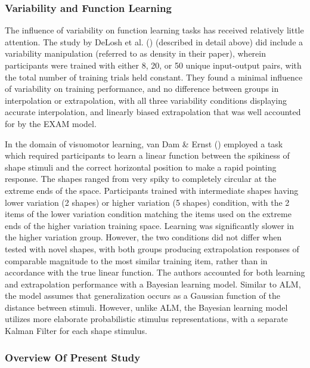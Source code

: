 \documentclass[
  11pt,
  letterpaper,
]{article}
\begin{document}
\subsubsection{Variability and Function
Learning}\label{variability-and-function-learning}

The influence of variability on function learning tasks has received
relatively little attention. The study by DeLosh et al.
() (described in
detail above) did include a variability manipulation (referred to as
density in their paper), wherein participants were trained with either
8, 20, or 50 unique input-output pairs, with the total number of
training trials held constant. They found a minimal influence of
variability on training performance, and no difference between groups in
interpolation or extrapolation, with all three variability conditions
displaying accurate interpolation, and linearly biased extrapolation
that was well accounted for by the EXAM model.

In the domain of visuomotor learning, van Dam \& Ernst
() employed a task
which required participants to learn a linear function between the
spikiness of shape stimuli and the correct horizontal position to make a
rapid pointing response. The shapes ranged from very spiky to completely
circular at the extreme ends of the space. Participants trained with
intermediate shapes having lower variation (2 shapes) or higher
variation (5 shapes) condition, with the 2 items of the lower variation
condition matching the items used on the extreme ends of the higher
variation training space. Learning was significantly slower in the
higher variation group. However, the two conditions did not differ when
tested with novel shapes, with both groups producing extrapolation
responses of comparable magnitude to the most similar training item,
rather than in accordance with the true linear function. The authors
accounted for both learning and extrapolation performance with a
Bayesian learning model. Similar to ALM, the model assumes that
generalization occurs as a Gaussian function of the distance between
stimuli. However, unlike ALM, the Bayesian learning model utilizes more
elaborate probabilistic stimulus representations, with a separate Kalman
Filter for each shape stimulus.

\subsubsection{Overview Of Present
Study}\label{overview-of-present-study}
\end{document}
